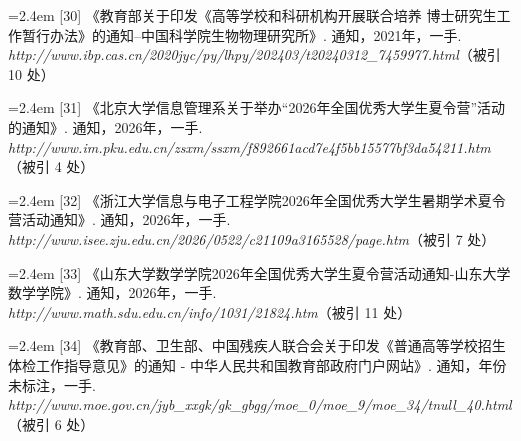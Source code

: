 {\nopagebreak\vspace{1pt}
\noindent\hangindent=2.4em \label{src:S0034}{\color{cAccent}[30]} 《教育部关于印发《高等学校和科研机构开展联合培养 博士研究生工作暂行办法》的通知--中国科学院生物物理研究所》. 通知，2021年，一手. \textit{http://www.ibp.cas.cn/2020jyc/py/lhpy/202403/t20240312\_7459977.html}（被引 10 处）\par
\vspace{0.6pt}
\vspace{3.5pt}\par
\nopagebreak\vspace{1pt}
\noindent\hangindent=2.4em \label{src:S0035}{\color{cAccent}[31]} 《北京大学信息管理系关于举办“2026年全国优秀大学生夏令营”活动的通知》. 通知，2026年，一手. \textit{http://www.im.pku.edu.cn/zsxm/ssxm/f892661acd7e4f5bb15577bf3da54211.htm}（被引 4 处）\par
\vspace{0.6pt}
\vspace{3.5pt}\par
\nopagebreak\vspace{1pt}
\noindent\hangindent=2.4em \label{src:S0036}{\color{cAccent}[32]} 《浙江大学信息与电子工程学院2026年全国优秀大学生暑期学术夏令营活动通知》. 通知，2026年，一手. \textit{http://www.isee.zju.edu.cn/2026/0522/c21109a3165528/page.htm}（被引 7 处）\par
\vspace{0.6pt}
\vspace{3.5pt}\par
\nopagebreak\vspace{1pt}
\noindent\hangindent=2.4em \label{src:S0037}{\color{cAccent}[33]} 《山东大学数学学院2026年全国优秀大学生夏令营活动通知-山东大学数学学院》. 通知，2026年，一手. \textit{http://www.math.sdu.edu.cn/info/1031/21824.htm}（被引 11 处）\par
\vspace{0.6pt}
\vspace{3.5pt}\par
\nopagebreak\vspace{1pt}
\noindent\hangindent=2.4em \label{src:S0039}{\color{cAccent}[34]} 《教育部、卫生部、中国残疾人联合会关于印发《普通高等学校招生体检工作指导意见》的通知 - 中华人民共和国教育部政府门户网站》. 通知，年份未标注，一手. \textit{http://www.moe.gov.cn/jyb\_xxgk/gk\_gbgg/moe\_0/moe\_9/moe\_34/tnull\_40.html}（被引 6 处）\par
}
